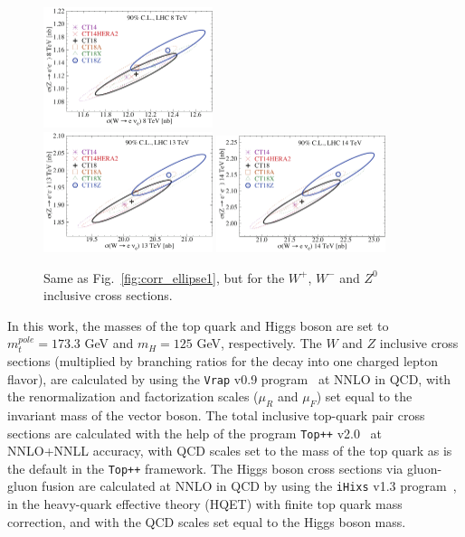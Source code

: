 \begin{widetext}
\begin{figure}[p]
\begin{center}
  \includegraphics[width=0.44\textwidth]{./fig/sec6/cor_tel_ct18s_W-Z__8TeV_shifted_KP_ect.pdf} \\
  \includegraphics[width=0.44\textwidth]{./fig/sec6/cor_tel_ct18s_W-Z_13TeV_shifted_KP_ect.pdf} 
  \includegraphics[width=0.44\textwidth]{./fig/sec6/cor_tel_ct18s_W-Z_14TeV_shifted_KP_ect.pdf} \\
	\end{center}
	\caption{Same as Fig.~\ref{fig:corr_ellipse1}, but for 
the $W^+$, $W^-$ and $Z^0$ inclusive cross
		sections.
		\label{fig:corr_ellipse2}}
\end{figure}
\end{widetext}

In this work, the masses of the top quark and Higgs boson
are set to $m_t^\mathit{pole}=173.3$ GeV and $m_H=125$ GeV, respectively.
The $W$ and $Z$ inclusive cross sections
(multiplied by branching ratios for the decay into one charged lepton flavor),
are calculated by using the \texttt{Vrap} v0.9 program~\cite{Anastasiou:2003ds,Anastasiou:2003yy} at NNLO in QCD, with the renormalization
and factorization scales ($\mu_R$ and $\mu_F$) set equal
to the invariant mass of the vector boson.
The total inclusive top-quark pair cross sections are calculated with
the help of the program \texttt{Top++}
v2.0~\cite{Czakon:2013goa,Top++} at NNLO+NNLL accuracy, with QCD
scales set to the mass of the top quark \cite{Czakon:2017wor} as is
the default in the \texttt{Top++} framework.
%
The Higgs boson cross sections via gluon-gluon fusion
are calculated at NNLO in QCD by using  the \texttt{iHixs} v1.3
program~\cite{Anastasiou:2011pi},
in the heavy-quark effective theory (HQET) with finite top quark mass correction,
and with the QCD scales set equal
to the Higgs boson mass.

